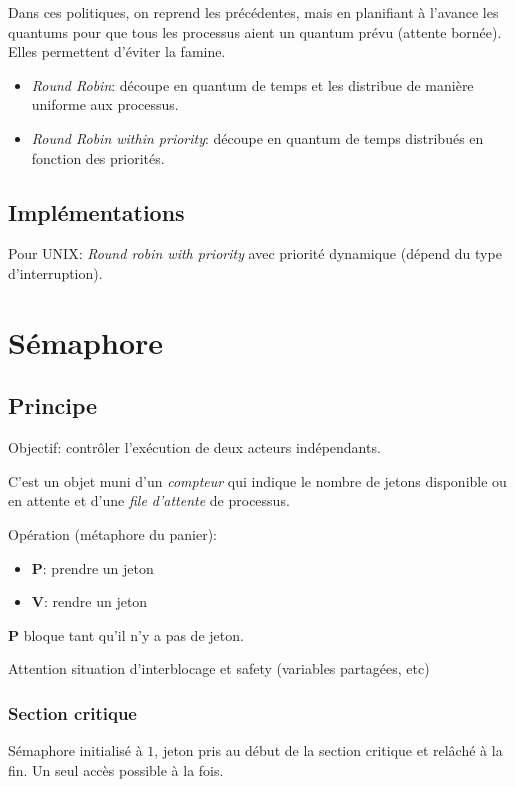 \documentclass[9pt,a4paper,twocolumn]{article}
\begin{document}
    Dans ces politiques, on reprend les précédentes, mais en planifiant à l'avance les quantums pour que tous les processus aient un quantum prévu (attente bornée).
    Elles permettent d'éviter la famine.
    \begin{itemize}
        \item \emph{Round Robin}: découpe en quantum de temps et les distribue de manière uniforme aux processus.
        \item \emph{Round Robin within priority}: découpe en quantum de temps distribués en fonction des priorités.
    \end{itemize}

    \subsection{Implémentations}

    Pour {UNIX}: \emph{Round robin with priority} avec priorité dynamique (dépend du type d'interruption).


\section{Sémaphore}

    \subsection{Principe}
    Objectif: contrôler l'exécution de deux acteurs indépendants.

    C'est un objet muni d'un \emph{compteur} qui indique le nombre de jetons disponible ou en attente et d'une \emph{file d'attente} de processus. 

    Opération (métaphore du panier): 
    \begin{itemize} 
        \item \textbf{P}: prendre un jeton
        \item \textbf{V}: rendre un jeton
    \end{itemize}

    \textbf{P} bloque tant qu'il n'y a pas de jeton. 

    Attention situation d'interblocage et safety (variables partagées, etc)

    \subsubsection{Section critique}

    Sémaphore initialisé à $1$, jeton pris au début de la section critique et relâché à la fin. Un seul accès possible à la fois. 
\end{document}
